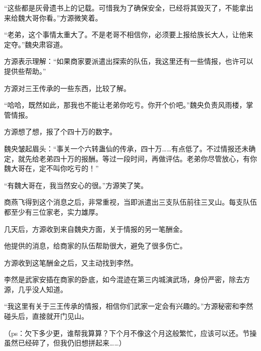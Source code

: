 \begin{this_body}
“这些都是灰骨遗书上的记载。可惜我为了确保安全，已经将其毁灭了，不能拿出来给魏大哥你看。”方源微笑着。

“老弟，这个事情太重大了。不是老哥不相信你，必须要上报给族长大人，让他来定夺。”魏央肃容道。

方源表示理解：“如果商家要派遣出探索的队伍，我这里还有一些情报，也许可以提供些帮助。”

方源对三王传承的一些东西，比较了解。

“哈哈，既然如此，那我也不能让老弟你吃亏。你开个价吧。”魏央负责风雨楼，掌管情报。

方源想了想，报了个四十万的数字。

魏央皱起眉头：“事关一个六转蛊仙的传承，四十万……有点低了。不过情报还未确定，就先给老弟四十万的报酬。等过一段时间，再做评估。老弟你尽管放心，有你魏大哥在，定不叫你吃亏的！”

“有魏大哥在，我当然安心的很。”方源笑了笑。

商燕飞得到这个消息之后，非常重视，当即派遣出三支队伍前往三叉山。每支队伍都至少有三位家老，实力雄厚。

几天后，方源收到来自魏央方面，关于情报的另一笔酬金。

他提供的消息，给商家的队伍帮助很大，避免了很多伤亡。

方源收到这笔酬金之后，又主动找到李然。

李然是武家安插在商家的卧底，如今混迹在第三内城演武场，身份严密，除去方源，几乎没人知道。

“我这里有关于三王传承的情报，相信你们武家一定会有兴趣的。”方源秘密和李然碰头后，直接就开门见山。

（ps：欠下多少更，谁帮我算算？下个月不像这个月这般繁忙，应该可以还。节操虽然已经碎了，但我仍旧想拼起来……）

\end{this_body}

